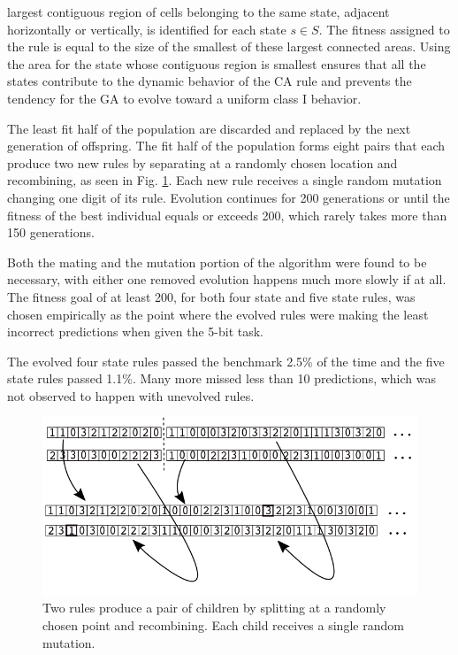\documentclass{facconf}
\begin{document}
\begin{multicols}{2}
     largest contiguous region of cells belonging to the same state, adjacent 
     horizontally or vertically, is identified for each state $s \in S$. The 
     fitness assigned to the rule is equal to the size of the smallest of these 
     largest connected areas. Using the area for the state whose contiguous 
     region is smallest ensures that all the states contribute to the dynamic 
     behavior of the CA rule and prevents the tendency for the GA to evolve 
     toward a uniform class I behavior. \par The least fit half of the 
     population are discarded and replaced by the next generation of offspring.  
     The fit half of the population forms eight pairs that each produce two new 
     rules by separating at a randomly chosen location and recombining, as seen 
     in Fig. \ref{GA}. Each new rule receives a single random mutation changing 
     one digit of its rule. Evolution continues for 200 generations or until 
     the fitness of the best individual equals or exceeds 200, which rarely 
     takes more than 150 generations.  \par Both the mating and the mutation 
     portion of the algorithm were found to be necessary, with either one 
     removed evolution happens much more slowly if at all. The fitness goal of 
     at least 200, for both four state and five state rules, was chosen 
     empirically as the point where the evolved rules were making the least 
     incorrect predictions when given the 5-bit task. \par
     The evolved four state rules passed the benchmark 2.5\% of the time and 
     the five state rules passed 1.1\%. Many more missed less than 10 
     predictions, which was not observed to happen with unevolved rules.




\begin{figure}[H]
  \centering
    \includegraphics[width=\linewidth]{GA.png}
  \caption{Two rules produce a pair of children by splitting at a randomly 
      chosen point and recombining. Each child receives a single random 
          mutation.}
  \label{GA}
  \end{figure}


\end{multicols}
\end{document}
